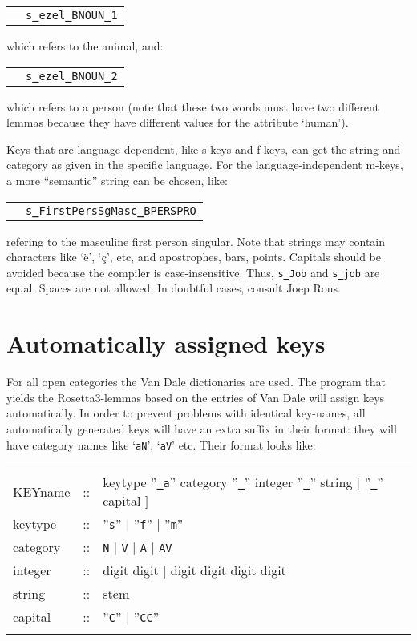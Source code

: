 \begin{tabular}{ll}
   & {\tt s{\bf \_}ezel{\bf \_}BNOUN{\bf \_}1} \\
\end{tabular}

which refers to the animal, 
and:

\begin{tabular}{ll}
   & {\tt s{\bf \_}ezel{\bf \_}BNOUN{\bf \_}2} \\
\end{tabular}

which refers to a person
(note that these two words must have two different lemmas because they have
different values for the attribute `human').

Keys that are language-dependent, like s-keys and f-keys, can get the string 
and category as given in the specific language. For the language-independent 
m-keys, a more ``semantic'' string can be chosen, like:


\begin{tabular}{ll}
   & {\tt s{\bf \_}FirstPersSgMasc{\bf \_}BPERSPRO} \\
\end{tabular}

refering to the masculine first person singular.
Note that strings may contain characters like `\"{e}', `\c{c}', etc, and 
apostrophes, bars, points. 
Capitals should be avoided because the compiler is case-insensitive. Thus,
{\tt s{\bf \_}Job} and {\tt s{\bf \_}job} are equal. Spaces are not allowed.
In doubtful cases, consult Joep Rous.


\section{Automatically assigned keys}

For all open categories the Van Dale dictionaries are used. The program that
yields the Rosetta3-lemmas based on the entries of Van Dale will assign
keys automatically. In order to prevent problems with identical key-names,
all automatically generated keys will have an extra suffix in their format:
they will have category names like `{\tt aN}', `{\tt aV}' etc. Their
format looks like:

\begin{tabular}{lcl} 
        &    &   \\
KEYname & :: & keytype ''{\tt {\bf \_}a}'' category ''{\tt {\bf \_}}'' integer  
               ''{\tt {\bf \_}}'' string $[$ ''{\tt {\bf \_}}''  capital $]$\\
keytype & :: & ''{\tt s}'' $\mid$ ''{\tt f}'' $\mid$ ''{\tt m}'' \\
category & :: & {\tt N} $\mid$ {\tt V} $\mid$ {\tt A} $\mid$ {\tt AV} \\
integer & :: & digit digit $\mid$ digit digit digit digit \\
string  & :: & stem    \\
capital & :: & ''{\tt C}'' $\mid$ ''{\tt CC}'' \\
        &    &   \\
\end{tabular}


